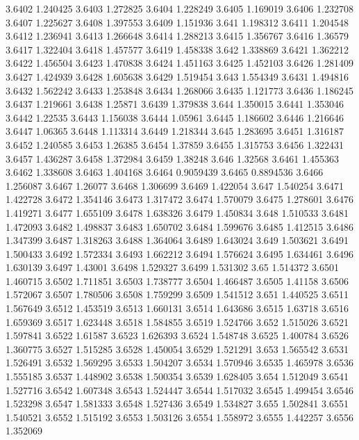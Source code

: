 3.6402  1.240425
3.6403  1.272825
3.6404  1.228249
3.6405  1.169019
3.6406  1.232708
3.6407  1.225627
3.6408  1.397553
3.6409  1.151936
3.641  1.198312
3.6411  1.204548
3.6412  1.236941
3.6413  1.266648
3.6414  1.288213
3.6415  1.356767
3.6416  1.36579
3.6417  1.322404
3.6418  1.457577
3.6419  1.458338
3.642  1.338869
3.6421  1.362212
3.6422  1.456504
3.6423  1.470838
3.6424  1.451163
3.6425  1.452103
3.6426  1.281409
3.6427  1.424939
3.6428  1.605638
3.6429  1.519454
3.643  1.554349
3.6431  1.494816
3.6432  1.562242
3.6433  1.253848
3.6434  1.268066
3.6435  1.121773
3.6436  1.186245
3.6437  1.219661
3.6438  1.25871
3.6439  1.379838
3.644  1.350015
3.6441  1.353046
3.6442  1.22535
3.6443  1.156038
3.6444  1.05961
3.6445  1.186602
3.6446  1.216646
3.6447  1.06365
3.6448  1.113314
3.6449  1.218344
3.645  1.283695
3.6451  1.316187
3.6452  1.240585
3.6453  1.26385
3.6454  1.37859
3.6455  1.315753
3.6456  1.322431
3.6457  1.436287
3.6458  1.372984
3.6459  1.38248
3.646  1.32568
3.6461  1.455363
3.6462  1.338608
3.6463  1.404168
3.6464  0.9059439
3.6465  0.8894536
3.6466  1.256087
3.6467  1.26077
3.6468  1.306699
3.6469  1.422054
3.647  1.540254
3.6471  1.422728
3.6472  1.354146
3.6473  1.317472
3.6474  1.570079
3.6475  1.278601
3.6476  1.419271
3.6477  1.655109
3.6478  1.638326
3.6479  1.450834
3.648  1.510533
3.6481  1.472093
3.6482  1.498837
3.6483  1.650702
3.6484  1.599676
3.6485  1.412515
3.6486  1.347399
3.6487  1.318263
3.6488  1.364064
3.6489  1.643024
3.649  1.503621
3.6491  1.500433
3.6492  1.572334
3.6493  1.662212
3.6494  1.576624
3.6495  1.634461
3.6496  1.630139
3.6497  1.43001
3.6498  1.529327
3.6499  1.531302
3.65  1.514372
3.6501  1.460715
3.6502  1.711851
3.6503  1.738777
3.6504  1.466487
3.6505  1.41158
3.6506  1.572067
3.6507  1.780506
3.6508  1.759299
3.6509  1.541512
3.651  1.440525
3.6511  1.567649
3.6512  1.453519
3.6513  1.660131
3.6514  1.643686
3.6515  1.63718
3.6516  1.659369
3.6517  1.623448
3.6518  1.584855
3.6519  1.524766
3.652  1.515026
3.6521  1.597841
3.6522  1.61587
3.6523  1.626393
3.6524  1.548748
3.6525  1.400784
3.6526  1.360775
3.6527  1.515285
3.6528  1.450054
3.6529  1.521291
3.653  1.565542
3.6531  1.526491
3.6532  1.569295
3.6533  1.504207
3.6534  1.570946
3.6535  1.465978
3.6536  1.555185
3.6537  1.448902
3.6538  1.500354
3.6539  1.628405
3.654  1.512049
3.6541  1.527716
3.6542  1.607348
3.6543  1.524447
3.6544  1.517032
3.6545  1.499454
3.6546  1.523298
3.6547  1.581333
3.6548  1.527436
3.6549  1.534827
3.655  1.502841
3.6551  1.540521
3.6552  1.515192
3.6553  1.503126
3.6554  1.558972
3.6555  1.442257
3.6556  1.352069
